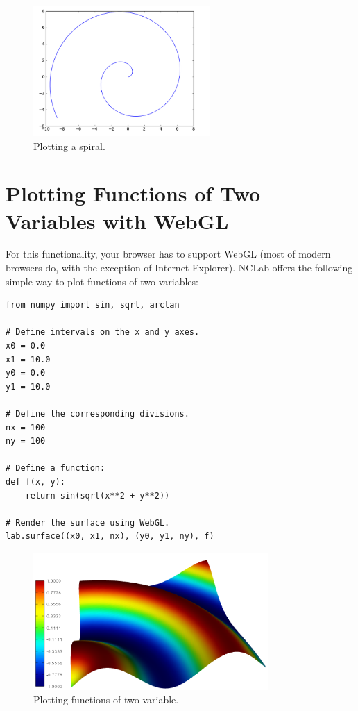 \documentclass[article,A4,12pt]{llncs}
\begin{document}
\begin{figure}[!ht]
\begin{center}
\includegraphics[width=0.6\textwidth]{img/plot6.png}
\end{center}
\vspace{-6mm}
\caption{Plotting a spiral.}
\label{fig:plot6}
\vspace{-4mm}
\end{figure}
\noindent


\section{Plotting Functions of Two Variables with WebGL}

For this functionality, your browser has to support WebGL (most of modern browsers do, 
with the exception of Internet Explorer). NCLab offers the following simple way to plot 
functions of two variables:

\begin{verbatim}
from numpy import sin, sqrt, arctan

# Define intervals on the x and y axes.
x0 = 0.0
x1 = 10.0
y0 = 0.0
y1 = 10.0

# Define the corresponding divisions.
nx = 100
ny = 100

# Define a function:
def f(x, y):
    return sin(sqrt(x**2 + y**2))

# Render the surface using WebGL.
lab.surface((x0, x1, nx), (y0, y1, ny), f)
\end{verbatim}

\begin{figure}[!ht]
\begin{center}
\includegraphics[width=0.8\textwidth]{img/webgl.png}
\end{center}
\vspace{-2mm}
\caption{Plotting functions of two variable.}
\label{fig:webgl}
\end{figure}
\end{document}
